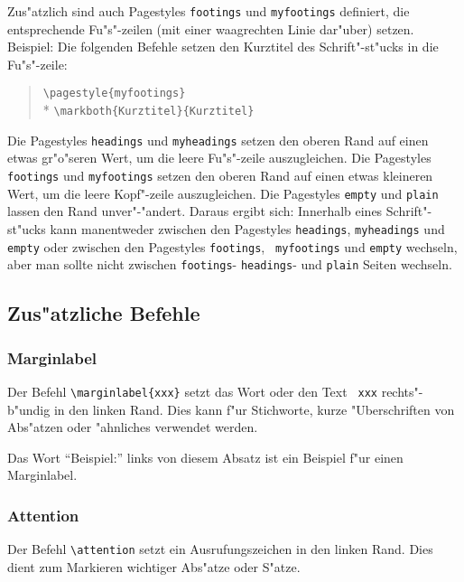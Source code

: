 Zus"atzlich sind auch Pagestyles \texttt{footings} und \texttt{myfootings} 
definiert, die entsprechende Fu"s"-zeilen (mit einer waagrechten Linie 
dar"uber) setzen. Beispiel: Die folgenden Befehle setzen den Kurztitel des 
Schrift"-st"ucks in die Fu"s"-zeile:
\begin{verse}
\verb|\pagestyle{myfootings}| \\*
\verb|\markboth{Kurztitel}{Kurztitel}|
\end{verse}

Die Pagestyles \texttt{headings} und \texttt{myheadings} setzen den
oberen Rand auf einen etwas gr"o"seren Wert, um die leere Fu"s"-zeile
auszugleichen. Die Pagestyles \texttt{footings} und \texttt{myfootings}
setzen den oberen Rand auf einen etwas kleineren Wert, um die leere
Kopf"-zeile auszugleichen. Die Pagestyles \texttt{empty} und
\texttt{plain} lassen den Rand unver"-"andert. Daraus ergibt sich:
Innerhalb eines Schrift"-st"ucks kann manentweder zwischen den
Pagestyles \texttt{headings}, \texttt{myheadings} und \texttt{empty}
\newline oder zwischen den Pagestyles \texttt{footings},
\texttt{ myfootings} und \texttt{empty} 
wechseln, aber man sollte nicht zwischen \texttt{footings}- 
\texttt{headings}- und \texttt{plain} Seiten wechseln.


\subsection{Zus"atzliche Befehle}

\subsubsection{Marginlabel}

Der Befehl \verb|\marginlabel{xxx}| setzt das Wort oder den Text
\texttt{ xxx} rechts"-b"undig in den linken Rand. Dies kann f"ur
Stichworte, kurze "Uberschriften von Abs"atzen oder "ahnliches verwendet
werden.

Das Wort "`Beispiel:"' links von diesem Absatz
ist ein Beispiel f"ur einen Marginlabel.

\subsubsection{Attention}

Der Befehl \verb|\attention| setzt ein Ausrufungszeichen in den linken 
Rand. Dies dient zum Markieren wichtiger Abs"atze oder S"atze.

